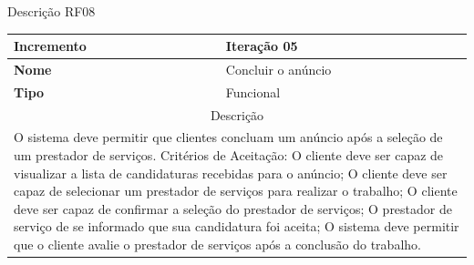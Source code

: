 \clearpage
\begin{quadro}[htb]
	\centering
	\caption{\label{Formatação do texto.}Descrição RF08}	
	\begin{tabular}{|l|p{11cm}|}
		\hline
		\textbf{Incremento}    & Iteração 05\\ \hline
		\textbf{Nome}    & Concluir o anúncio\\ \hline
		\textbf{Tipo}    & Funcional\\ \hline
		\multicolumn{2}{|c|}{Descrição}\\ \hline
		\multicolumn{2}{|p{12cm}|}{
			O sistema deve permitir que clientes concluam um anúncio após a seleção de um prestador de serviços. \newline
			\newline Critérios de Aceitação: \newline
			O cliente deve ser capaz de visualizar a lista de candidaturas recebidas para o anúncio; \newline
            O cliente deve ser capaz de selecionar um prestador de serviços para realizar o trabalho; \newline
			O cliente deve ser capaz de confirmar a seleção do prestador de serviços; \newline
			O prestador de serviço de se informado que sua candidatura foi aceita; \newline
			O sistema deve permitir que o cliente avalie o prestador de serviços após a conclusão do trabalho.
			} \\ \hline
	\end{tabular}
\end{quadro}

